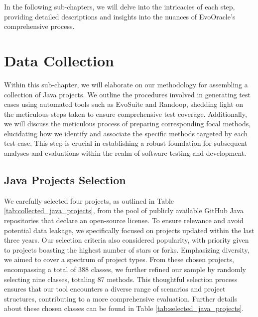 In the following sub-chapters, we will delve into the intricacies of each step, providing detailed descriptions and insights into the nuances of EvoOracle's comprehensive process.

\section{Data Collection}
\label{sec:data_collection}
\vspace{0.2 cm}
Within this sub-chapter, we will elaborate on our methodology for assembling a collection of Java projects. We outline the procedures involved in generating test cases using automated tools such as EvoSuite and Randoop\cite{noauthor_randoop_nodate}, shedding light on the meticulous steps taken to ensure comprehensive test coverage. Additionally, we will discuss the meticulous process of preparing corresponding focal methods, elucidating how we identify and associate the specific methods targeted by each test case. This step is crucial in establishing a robust foundation for subsequent analyses and evaluations within the realm of software testing and development.

\vspace{0.1 cm}
\subsection{Java Projects Selection}
\label{sec:projects_selection}
\vspace{0.1 cm}

We carefully selected four projects, as outlined in Table \ref{tab:collected_java_projects}, from the pool of publicly available GitHub Java repositories that declare an open-source license. To ensure relevance and avoid potential data leakage, we specifically focused on projects updated within the last three years. Our selection criteria also considered popularity, with priority given to projects boasting the highest number of stars or forks. Emphasizing diversity, we aimed to cover a spectrum of project types. From these chosen projects, encompassing a total of 388 classes, we further refined our sample by randomly selecting nine classes, totaling 87 methods. This thoughtful selection process ensures that our tool encounters a diverse range of scenarios and project structures, contributing to a more comprehensive evaluation. Further details about these chosen classes can be found in Table \ref{tab:selected_java_projects}.

